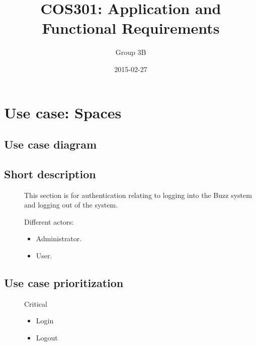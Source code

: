 \documentclass[a4paper, 10pt, oneside]{report}
\title{COS301: Application and Functional Requirements}
\date{2015-02-27}
\author{Group 3B}
\begin{document}
	\section{Use case: Spaces}
	\subsection{Use case diagram}
	\subsection{Short description}
	\begin{description}
		
		\item[] 
			This section is for authentication relating to logging into the Buzz system and logging out of the system.
		
		\item[] Different actors:
		\begin{itemize}
			\item Administrator.
			\item User.   
		\end{itemize}
		
	\end{description}
	
	\subsection{Use case prioritization}
	\begin{description}
		\item[] Critical
		\begin{itemize}
			\item Login
			\item Logout
		\end{itemize}
	\end{description}
	
\end{document}
